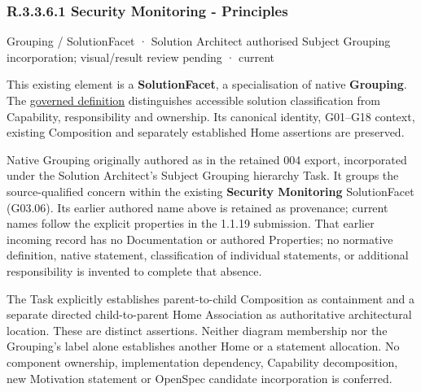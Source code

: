 \subsubsection*{R.3.3.6.1 Security Monitoring - Principles}
\label{navigation:R.3.3.6.1}

\label{element:2423108223e14d27a7bf59610034297a}
{\small Grouping / SolutionFacet · Solution Architect authorised Subject Grouping incorporation; visual/result review pending · current}\par

This existing element is a \textbf{SolutionFacet}, a specialisation of native
\textbf{Grouping}. The \href{\detokenize{../../../../../../../governance/continuum-representation.md#solutionfacet-classification--1119-candidate}}{governed definition}
distinguishes accessible solution classification from Capability, responsibility
and ownership. Its canonical identity, G01–G18 context, existing Composition
and separately established Home assertions are preserved.



Native Grouping originally authored as \texttt{} in the retained 004 export,
incorporated under the Solution Architect's Subject Grouping hierarchy Task.
It groups the source-qualified \texttt{} concern within
the existing \textbf{Security Monitoring} SolutionFacet (G03.06). Its earlier authored name above is retained as provenance; current names
follow the explicit properties in the 1.1.19 submission.
That earlier incoming record has no Documentation or authored Properties; no normative
definition, native statement, classification of individual statements, or
additional responsibility is invented to complete that absence.



The Task explicitly establishes parent-to-child Composition as containment and
a separate directed child-to-parent Home Association as authoritative architectural
location. These are distinct assertions. Neither diagram membership nor the
Grouping's label alone establishes another Home or a statement allocation.
No component ownership, implementation dependency, Capability decomposition,
new Motivation statement or OpenSpec candidate incorporation is conferred.



